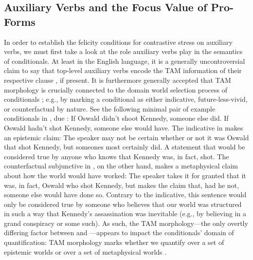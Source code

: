 \subsection{Auxiliary Verbs and the Focus Value of Pro-Forms}
In order to establish the felicity conditions for contrastive stress on auxiliary verbs, we must first take a look at the role auxiliary verbs play in the semantics of conditionals. At least in the English language, it is a generally uncontroversial claim to say that top-level auxiliary verbs encode the TAM information of their respective clause \parencites{Chomsky1957}{Akmajian1979}[amongst others]{Klein1994}, if present. It is furthermore generally accepted that TAM morphology is crucially connected to the domain world selection process of conditionals \parencites{Palmer1986}{Iatridou2000}{Arregui2009}{Romero2014}{Schulz2014}; e.g., by marking a conditional as either indicative, future-less-vivid, or counterfactual by nature. See the following minimal pair of example conditionals in , due \textcite[p.~90]{Adams1970}:
\pex[nopreamble=true]\label{ex:kennedy}%
\a{} If Oswald didn't shoot Kennedy, someone else did.
\a{} If Oswald hadn't shot Kennedy, someone else would have.
\xe
The indicative in  makes an epistemic claim: The speaker may not be certain whether or not it was Oswald that shot Kennedy, but someones most certainly did. A statement that would be considered true by anyone who knows that Kennedy was, in fact, shot. The counterfactual subjunctive in , on the other hand, makes a metaphysical claim about how the world would have worked: The speaker takes it for granted that it was, in fact, Oswald who shot Kennedy, but makes the claim that, had he not, someone else would have done so. Contrary to the indicative, this sentence would only be considered true by someone who believes that our world was structured in such a way that Kennedy's assassination was inevitable (e.g., by believing in a grand conspiracy or some such). As such, the TAM morphology---the only overtly differing factor between  and ---appears to impact the conditionals' domain of quantification: TAM morphology marks whether we quantify over a set of epistemic worlds or over a set of metaphysical worlds \parencite[see, amongst others,][p.~62]{Condoravdi2002}.


